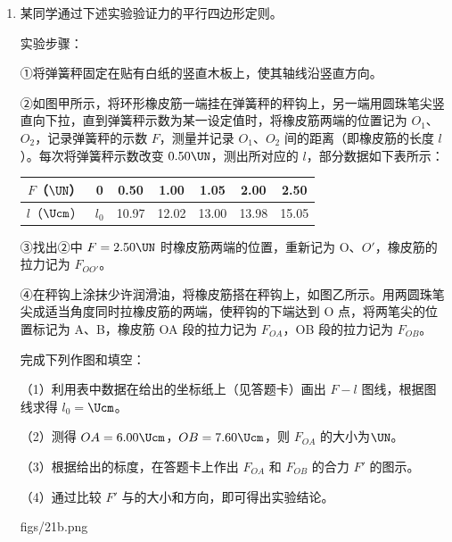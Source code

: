 \documentclass[\gkver]{gaokaozhenti}
\begin{document}
\begin{enumerate}
\item
某同学通过下述实验验证力的平行四边形定则。

实验步骤：

①将弹簧秤固定在贴有白纸的竖直木板上，使其轴线沿竖直方向。

②如图甲所示，将环形橡皮筋一端挂在弹簧秤的秤钩上，另一端用圆珠笔尖竖直向下拉，直到弹簧秤示数为某一设定值时，将橡皮筋两端的位置记为 $O_{1}$、$O_{2}$，记录弹簧秤的示数 $F$，测量并记录 $O_{1}$、$O_{2}$ 间的距离（即橡皮筋的长度 $l$）。每次将弹簧秤示数改变 $0.50\UN$，测出所对应的 $l$，部分数据如下表所示：

\begin{center}
\begin{tabular}{|c|c|c|c|c|c|c|}
\hline
$F$（$\UN$） & 0 & 0.50 & 1.00 & 1.05 & 2.00 & 2.50 \\
\hline
$l$（$\Ucm$） & $l_{0}$ & 10.97 & 12.02 & 13.00 & 13.98 & 15.05 \\
\hline
\end{tabular}
\end{center}

③找出②中 $F=2.50\UN$ 时橡皮筋两端的位置，重新记为 O、$O'$，橡皮筋的拉力记为 $F_{OO'}$。

④在秤钩上涂抹少许润滑油，将橡皮筋搭在秤钩上，如图乙所示。用两圆珠笔尖成适当角度同时拉橡皮筋的两端，使秤钩的下端达到 O 点，将两笔尖的位置标记为 A、B，橡皮筋 OA 段的拉力记为 $F_{OA}$，OB 段的拉力记为 $F_{OB}$。

完成下列作图和填空：

（1）利用表中数据在给出的坐标纸上（见答题卡）画出 $F-l$ 图线，根据图线求得 $l_{0}=$$\Ucm$。

（2）测得 $OA=6.00\Ucm$，$OB=7.60\Ucm$，则 $F_{OA}$ 的大小为$\UN$。

（3）根据给出的标度，在答题卡上作出 $F_{OA}$ 和 $F_{OB}$ 的合力 $F'$ 的图示。

（4）通过比较 $F'$ 与的大小和方向，即可得出实验结论。

{figs/21b.png}

\end{enumerate}
\end{document}

